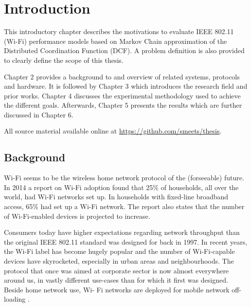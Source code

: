 
\chapter{Introduction}

This introductory chapter describes the motivations to evaluate IEEE 802.11
(Wi-Fi) performance models based on Markov Chain approximation of the
Distributed Coordination Function (DCF). A problem definition is also provided
to clearly define the scope of this thesis.

Chapter 2 provides a background to and overview of related systems, protocols
and hardware. It is followed by Chapter 3 which introduces the research field
and prior works. Chapter 4 discusses the experimental methodology used to
achieve the different goals. Afterwards, Chapter 5 presents the results which
are further discussed in Chapter 6.

All source material available online at \url{https://github.com/smeets/thesis}.

\section{Background}


Wi-Fi seems to be the wireless home network protocol of the (forseeable)
future. In 2014 a report on Wi-Fi adoption found that 25\% of households, all
over the world, had Wi-Fi networks set up. In households with fixed-line
broadband access, 65\% had set up a Wi-Fi network\cite{smith}. The report also
states that the number of Wi-Fi-enabled devices is projected to increase.

Consumers today have higher expectations regarding network throughput than the
original IEEE 802.11 standard was designed for back in 1997. In recent years,
the Wi-Fi label has become hugely popular and the number of Wi-Fi-capable
devices have skyrocketed, especially in urban areas and neighbourhoods. The
protocol that once was aimed at corporate sector is now almost everywhere
around us, in vastly different use-cases than for which it first was designed.
Beside home network use, Wi- Fi networks are deployed for mobile network
off-loading \cite{offloading}.

